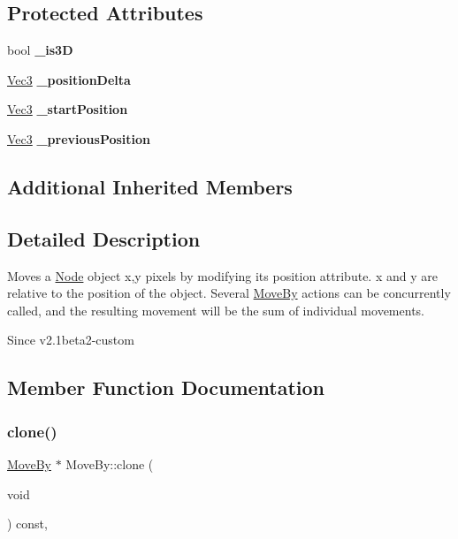 \subsection*{Protected Attributes}
\begin{DoxyCompactItemize}
\item 
\mbox{\label{classMoveBy_a618e118e1bf2e3623f0d8d7ec49ef1d2}} 
bool {\bfseries \+\_\+is3D}
\item 
\mbox{\label{classMoveBy_ac4fa686b4afa97d23d37d176c5350706}} 
\hyperlink{classVec3}{Vec3} {\bfseries \+\_\+position\+Delta}
\item 
\mbox{\label{classMoveBy_a5113346f591d52f1d748f7903399114b}} 
\hyperlink{classVec3}{Vec3} {\bfseries \+\_\+start\+Position}
\item 
\mbox{\label{classMoveBy_a1f764f19b4eaff6cb3fbc43bb0c3d724}} 
\hyperlink{classVec3}{Vec3} {\bfseries \+\_\+previous\+Position}
\end{DoxyCompactItemize}
\subsection*{Additional Inherited Members}


\subsection{Detailed Description}
Moves a \hyperlink{classNode}{Node} object x,y pixels by modifying it\textquotesingle{}s position attribute. x and y are relative to the position of the object. Several \hyperlink{classMoveBy}{Move\+By} actions can be concurrently called, and the resulting movement will be the sum of individual movements. 

\begin{DoxySince}{Since}
v2.\+1beta2-\/custom 
\end{DoxySince}


\subsection{Member Function Documentation}
\mbox{\label{classMoveBy_a56e7a18b9eb4a9c106bac223103f937f}} 
\subsubsection{\texorpdfstring{clone()}{clone()}\hspace{0.1cm}{\footnotesize\ttfamily [1/2]}}
{\footnotesize\ttfamily \hyperlink{classMoveBy}{Move\+By} $\ast$ Move\+By\+::clone (\begin{DoxyParamCaption}\item[{void}]{ }\end{DoxyParamCaption}) const\hspace{0.3cm}{\ttfamily [override]}, {\ttfamily [virtual]}}

